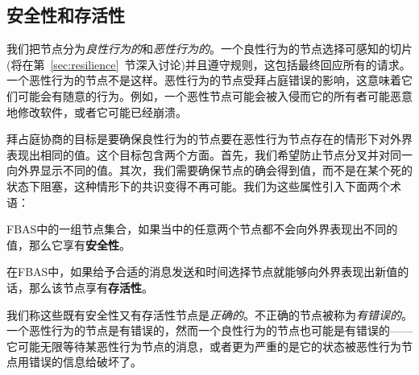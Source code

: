 \subsection{安全性和存活性}\label{sec:fba-safe-live}

我们把节点分为\textit{良性行为的}和\textit{恶性行为的}。一个良性行为的节点选择可感知的{\quorum}切片(将在第~\ref{sec:resilience}~节深入讨论)并且遵守规则，这包括最终回应所有的请求。一个恶性行为的节点不是这样。恶性行为的节点受拜占庭错误的影响，这意味着它们可能会有随意的行为。例如，一个恶性节点可能会被入侵而它的所有者可能恶意地修改软件，或者它可能已经崩溃。

拜占庭协商的目标是要确保良性行为的节点要在恶性行为节点存在的情形下对外界表现出相同的值。这个目标包含两个方面。首先，我们希望防止节点分叉并对同一{\slot}向外界显示不同的值。其次，我们需要确保节点的确会得到值，而不是在某个死的状态下阻塞，这种情形下的共识变得不再可能。我们为这些属性引入下面两个术语：

\begin{definition}[安全性]
	FBAS中的一组节点集合，如果当中的任意两个节点都不会向外界表现出不同的值，那么它享有{\textbf{安全性}}。
\end{definition}

\begin{definition}[存活性]
	在FBAS中，如果给予合适的消息发送和时间选择节点就能够向外界表现出新值的话，那么该节点享有{\textbf{存活性}}。
\end{definition}

我们称这些既有安全性又有存活性节点是\textit{正确的}。不正确的节点被称为{\textit{有错误的}}。一个恶性行为的节点是有错误的，然而一个良性行为的节点也可能是有错误的——它可能无限等待某恶性行为节点的消息，或者更为严重的是它的状态被恶性行为节点用错误的信息给破坏了。


